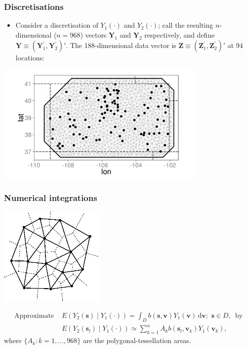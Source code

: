 \documentclass{beamer}
\newcommand{\svec} {\textbf{s}}
\newcommand{\s}{\mathbf{s}}
\renewcommand{\v}{\mathbf{v}}
\renewcommand{\d}{\mathrm{d}}
\newcommand{\Yvec}{\mathbf{Y}}
\newcommand{\Zvec}{\mathbf{Z}}
\newcommand{\E}{E}
\begin{document}
\begin{frame}
\frametitle{Discretisations}
\begin{itemize}
\item Consider a discretisation of $Y_1(\cdot)$ and $Y_2(\cdot)$; call the resulting $n$-dimensional ($n=968$) vectors $\Yvec_1$ and $\Yvec_2$ respectively, and define $\Yvec \equiv (\Yvec_1^{\prime},\Yvec_2^{\prime})'$. The 188-dimensional data vector is $\Zvec \equiv (\Zvec_1^{\prime},\Zvec_2^{\prime})'$ at 94 locations:
\end{itemize}

\vspace{-0.2in}
\begin{center}
\includegraphics[width=4in]{meshplot.png}
\end{center}

\end{frame}



\begin{frame}
\frametitle{Numerical integrations}

\vspace{-.8cm}
\begin{center}
\includegraphics[width=2in]{vor3.png}
\end{center}
\vspace{-.5cm}
\begin{align*}
\mbox{Approximate }&\displaystyle \E\left(Y_2(\s)\mid Y_1(\cdot)\right)=\int_D{b(\s,\v)Y_1(\v)\,\d \v};\,\,\s\in D,\,\mbox{ by}\\
&\E(Y_2(\svec_l) \mid  Y_1(\cdot)) \simeq \sum_{k=1}^{n} A_k b(\svec_l,\v_k)Y_1(\v_k),
\end{align*}
where $\{A_k:k=1,\ldots,968\}$ are the polygonal-tessellation areas.
\end{frame}
\end{document}
